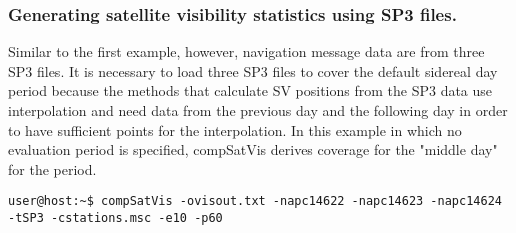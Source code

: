 \subsubsection{Generating satellite visibility statistics using SP3 files. }
Similar to the first example, however, navigation message data are from three SP3 files. It is necessary to load three SP3 files to cover the default sidereal day period because the methods that calculate SV positions from the SP3 data use interpolation and need data from the previous day and the following day in order to have sufficient points for the interpolation. In this example in which no evaluation period is specified, compSatVis derives coverage for the "middle day" for the period. 
\begin{verbatim}
user@host:~$ compSatVis -ovisout.txt -napc14622 -napc14623 -napc14624 
-tSP3 -cstations.msc -e10 -p60
\end{verbatim}

% 
